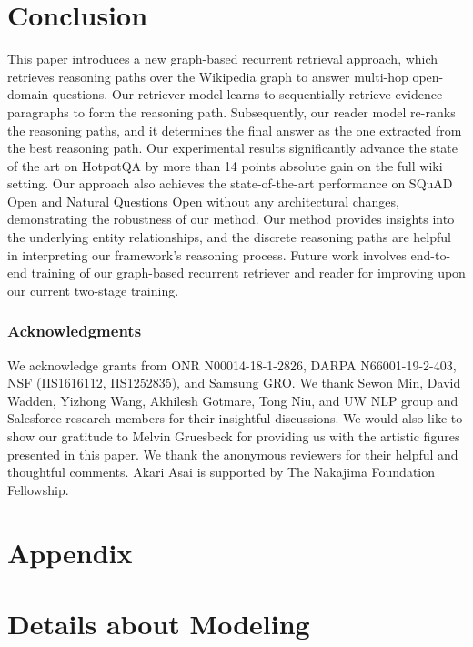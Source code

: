\section{Conclusion}
This paper introduces a new graph-based recurrent retrieval approach, which retrieves reasoning paths over the Wikipedia graph to answer multi-hop open-domain questions. 
Our retriever model learns to sequentially retrieve evidence paragraphs to form the reasoning path.
Subsequently, our reader model re-ranks the reasoning paths, and it determines the final answer as the one extracted from the best reasoning path. 
Our experimental results significantly advance the state of the art on HotpotQA by more than 14 points absolute gain on the full wiki setting.
Our approach also achieves the state-of-the-art performance on SQuAD Open and Natural Questions Open without any architectural changes, demonstrating the robustness of our method. 
Our method provides insights into the underlying entity relationships, and the discrete reasoning paths are helpful in interpreting our framework's reasoning process. %
Future work involves end-to-end training of our graph-based recurrent retriever and reader for improving upon our current two-stage training. 

\subsubsection*{Acknowledgments}
We acknowledge grants from ONR N00014-18-1-2826, DARPA
N66001-19-2-403, NSF (IIS1616112, IIS1252835), and Samsung GRO. 
We thank Sewon Min, David Wadden, Yizhong Wang, Akhilesh Gotmare, Tong Niu, and UW NLP group and Salesforce research members for their insightful discussions.
We would also like to show our gratitude to Melvin Gruesbeck for providing us with the artistic figures presented in this paper. 
We thank the anonymous reviewers for their helpful and thoughtful comments. 
Akari Asai is supported by The Nakajima Foundation Fellowship. 

\appendix

\section*{Appendix}

\section{Details about Modeling}

